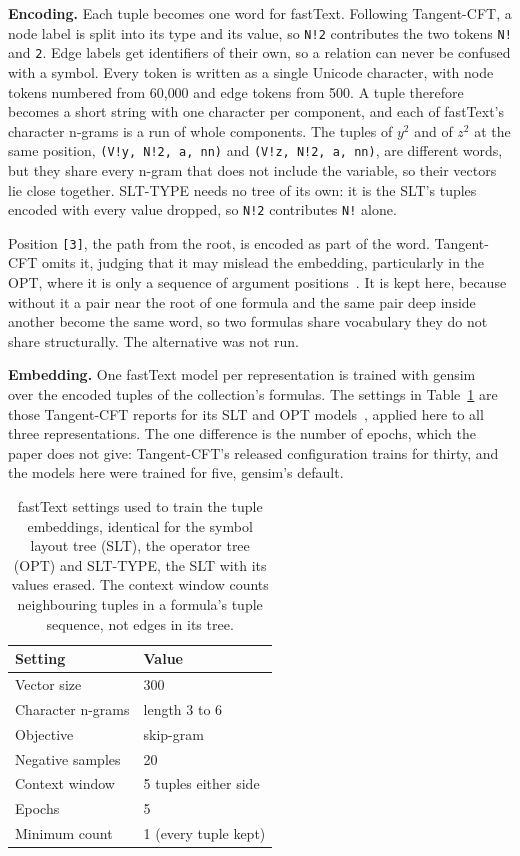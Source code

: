 \textbf{Encoding.} Each tuple becomes one word for fastText. Following Tangent-CFT, a node
label is split into its type and its value, so \texttt{N!2} contributes the two tokens
\texttt{N!} and \texttt{2}. Edge labels get identifiers of their own, so a relation can never
be confused with a symbol. Every token is written as a single Unicode character, with node
tokens numbered from 60{,}000 and edge tokens from 500. A tuple therefore becomes a short
string with one character per component, and each of fastText's character n-grams is a run of
whole components. The tuples of $y^2$ and of $z^2$ at the same position,
\texttt{(V!y, N!2, a, nn)} and \texttt{(V!z, N!2, a, nn)}, are different words, but they share
every n-gram that does not include the variable, so their vectors lie close together.
SLT-TYPE needs no tree of its own: it is the SLT's tuples encoded with every value dropped, so
\texttt{N!2} contributes \texttt{N!} alone.

Position \texttt{[3]}, the path from the root, is encoded as part of the word. Tangent-CFT
omits it, judging that it may mislead the embedding, particularly in the OPT, where it is only
a sequence of argument positions~\cite{mansouri2019tangentcft}. It is kept here, because
without it a pair near the root of one formula and the same pair deep inside another become
the same word, so two formulas share vocabulary they do not share structurally. The
alternative was not run.

\textbf{Embedding.} One fastText model per representation is trained with
gensim~\cite{rehurek2010gensim} over the encoded tuples of the collection's formulas. The
settings in Table~\ref{tab:met-fasttext} are those Tangent-CFT reports for its SLT and OPT
models~\cite{mansouri2019tangentcft}, applied here to all three representations. The one
difference is the number of epochs, which the paper does not give: Tangent-CFT's released
configuration trains for thirty, and the models here were trained for five, gensim's default.

\begin{table}[t]
\centering
\begin{tabular}{ll}
\toprule
Setting & Value \\
\midrule
Vector size       & 300 \\
Character n-grams & length 3 to 6 \\
Objective         & skip-gram \\
Negative samples  & 20 \\
Context window    & 5 tuples either side \\
Epochs            & 5 \\
Minimum count     & 1 (every tuple kept) \\
\bottomrule
\end{tabular}
\caption[fastText settings for the tuple embeddings]{fastText settings used to train the tuple embeddings, identical for the symbol layout
tree (SLT), the operator tree (OPT) and SLT-TYPE, the SLT with its values erased. The context
window counts neighbouring tuples in a formula's tuple sequence, not edges in its tree.}
\label{tab:met-fasttext}
\end{table}

